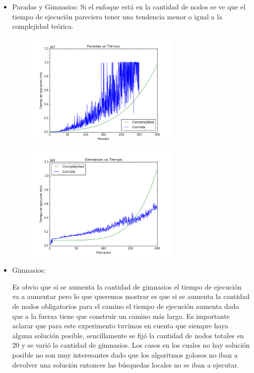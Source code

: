 \begin{itemize}

\item Paradas y Gimnasios: Si el enfoque est\'a en la cantidad de nodos se ve que el tiempo de ejecuci\'on pareciera tener una tendencia menor o igual a la complejidad teórica.

\begin{figure}[H]
	\begin{center}
		\includegraphics[width=0.7\textwidth]{img/ejercicio4/ParadasTiempos.png}
		\caption{}
		\label{fig: Paradas}
	\end{center}
\end{figure}
\begin{figure}[H]
	\begin{center}
		\includegraphics[width=0.7\textwidth]{img/ejercicio4/GimnasiosTiempos.png}
		\caption{}
		\label{fig: Gimnasios}
	\end{center}
\end{figure}


\item Gimnasios: 

Es obvio que si se aumenta la cantidad de gimnasios el tiempo de ejecuci\'on va a aumentar pero lo que queremos mostrar es que si se aumenta la cantidad de nodos obligatorios para el camino el tiempo de ejecuci\'on aumenta dado que a la fuerza tiene que construir un camino m\'as largo. Es importante aclarar que para este experimento tuvimos en cuenta que siempre haya alguna soluci\'on posible, sencillamente se fij\'o la cantidad de nodos totales en 20 y se vari\'o la cantidad de gimnasios. Los casos en los cuales no hay soluci\'on posible no son muy interesantes dado que los algoritmos golosos no iban a devolver una soluci\'on entonces las b\'usquedas locales no se iban a ejecutar.



\end{itemize}
